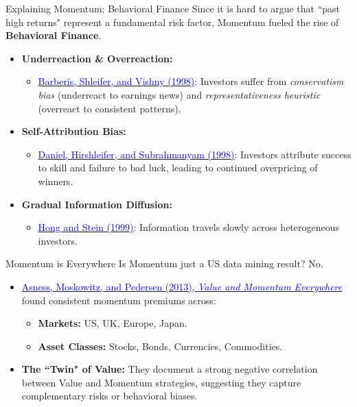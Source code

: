 \documentclass{beamer}
\begin{document}
\begin{frame}{Explaining Momentum: Behavioral Finance}
	Since it is hard to argue that ``past high returns" represent a fundamental risk factor, Momentum fueled the rise of \textbf{Behavioral Finance}.
	
	\begin{itemize}
		\item \textbf{Underreaction \& Overreaction:}
		\begin{itemize}
			\item \href{https://doi.org/10.1016/S0304-405X(98)00027-0}{\textcolor{blue}{Barberis, Shleifer, and Vishny (1998)}}: Investors suffer from \textit{conservatism bias} (underreact to earnings news) and \textit{representativeness heuristic} (overreact to consistent patterns).
		\end{itemize}
		\item \textbf{Self-Attribution Bias:}
		\begin{itemize}
			\item \href{https://doi.org/10.1111/0022-1082.00077}{\textcolor{blue}{Daniel, Hirshleifer, and Subrahmanyam (1998)}}: Investors attribute success to skill and failure to bad luck, leading to continued overpricing of winners.
		\end{itemize}
		\item \textbf{Gradual Information Diffusion:}
		\begin{itemize}
			\item \href{https://doi.org/10.1111/0022-1082.00184}{\textcolor{blue}{Hong and Stein (1999)}}: Information travels slowly across heterogeneous investors.
		\end{itemize}
	\end{itemize}
\end{frame}

\begin{frame}{Momentum is Everywhere}
	Is Momentum just a US data mining result? No.
	
	\begin{itemize}
		\item \href{https://doi.org/10.1111/jofi.12021}{\textcolor{blue}{Asness, Moskowitz, and Pedersen (2013), \textit{Value and Momentum Everywhere}}} found consistent momentum premiums across:
		\begin{itemize}
			\item \textbf{Markets:} US, UK, Europe, Japan.
			\item \textbf{Asset Classes:} Stocks, Bonds, Currencies, Commodities.
		\end{itemize}
		\item \textbf{The ``Twin" of Value:} They document a strong negative correlation between Value and Momentum strategies, suggesting they capture complementary risks or behavioral biases.
	\end{itemize}
\end{frame}
\end{document}
